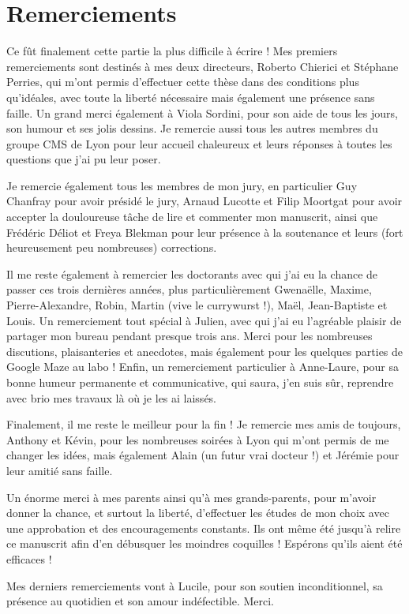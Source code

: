 
\begingroup
\let\clearpage\relax
\let\cleardoublepage\relax
\let\cleardoublepage\relax
\chapter*{Remerciements}

Ce fût finalement cette partie la plus difficile à écrire ! Mes premiers remerciements sont destinés à mes deux directeurs, Roberto Chierici et Stéphane Perries, qui m'ont permis d'effectuer cette thèse dans des conditions plus qu'idéales, avec toute la liberté nécessaire mais également une présence sans faille. Un grand merci également à Viola Sordini, pour son aide de tous les jours, son humour et ses jolis dessins. Je remercie aussi tous les autres membres du groupe CMS de Lyon pour leur accueil chaleureux et leurs réponses à toutes les questions que j'ai pu leur poser.

\bigskip

Je remercie également tous les membres de mon jury, en particulier Guy Chanfray pour avoir présidé le jury, Arnaud Lucotte et Filip Moortgat pour avoir accepter la douloureuse tâche de lire et commenter mon manuscrit, ainsi que Frédéric Déliot et Freya Blekman pour leur présence à la soutenance et leurs (fort heureusement peu nombreuses) corrections.

\bigskip

Il me reste également à remercier les doctorants avec qui j'ai eu la chance de passer ces trois dernières années, plus particulièrement Gwenaëlle, Maxime, Pierre-Alexandre, Robin, Martin (vive le currywurst !), Maël, Jean-Baptiste et Louis. Un remerciement tout spécial à Julien, avec qui j'ai eu l'agréable plaisir de partager mon bureau pendant presque trois ans. Merci pour les nombreuses discutions, plaisanteries et anecdotes, mais également pour les quelques parties de Google Maze au labo ! Enfin, un remerciement particulier à Anne-Laure, pour sa bonne humeur permanente et communicative, qui saura, j'en suis sûr, reprendre avec brio mes travaux là où je les ai laissés.

\bigskip

Finalement, il me reste le meilleur pour la fin ! Je remercie mes amis de toujours, Anthony et Kévin, pour les nombreuses soirées à Lyon qui m'ont permis de me changer les idées, mais également Alain (un futur vrai docteur !) et Jérémie pour leur amitié sans faille.

\bigskip

Un énorme merci à mes parents ainsi qu'à mes grands-parents, pour m'avoir donner la chance, et surtout la liberté, d'effectuer les études de mon choix avec une approbation et des encouragements constants. Ils ont même été jusqu'à relire ce manuscrit afin d'en débusquer les moindres coquilles ! Espérons qu'ils aient été efficaces !

\medskip

Mes derniers remerciements vont à Lucile, pour son soutien inconditionnel, sa présence au quotidien et son amour indéfectible. Merci.

\endgroup